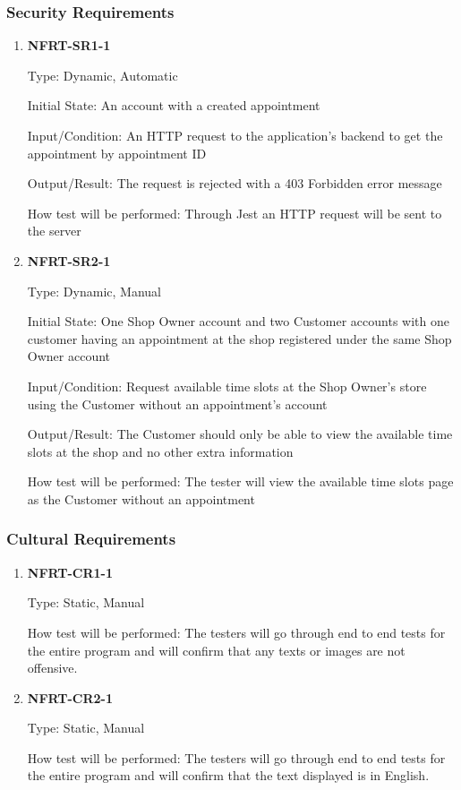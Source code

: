 \documentclass[12pt, titlepage]{article}
\begin{document}
\subsubsection{Security Requirements}
\begin{enumerate}

	\item \textbf{NFRT-SR1-1}

	      Type: Dynamic, Automatic

	      Initial State: An account with a created appointment

	      Input/Condition: An HTTP request to the application's backend to get the appointment by appointment
	      ID

	      Output/Result: The request is rejected with a 403 Forbidden error message

	      How test will be performed: Through Jest an HTTP request will be sent to the server

	\item \textbf{NFRT-SR2-1}

	      Type: Dynamic, Manual

	      Initial State: One Shop Owner account and two Customer accounts with one customer having an
	      appointment at the shop registered under the same Shop Owner account

	      Input/Condition: Request available time slots at the Shop Owner's store using the Customer without
	      an appointment's account

	      Output/Result: The Customer should only be able to view the available time slots at the shop and no
	      other extra information

	      How test will be performed: The tester will view the available time slots page as the Customer
	      without an appointment

\end{enumerate}

\subsubsection{Cultural Requirements}
\begin{enumerate}
	\item \textbf{NFRT-CR1-1}

	      Type: Static, Manual

	      How test will be performed: The testers will go through end to end tests for the entire program and
	      will confirm that any texts or images are not offensive.

	\item \textbf{NFRT-CR2-1}

	      Type: Static, Manual

	      How test will be performed: The testers will go through end to end tests for the entire program and
	      will confirm that the text displayed is in English.

\end{enumerate}
\end{document}

